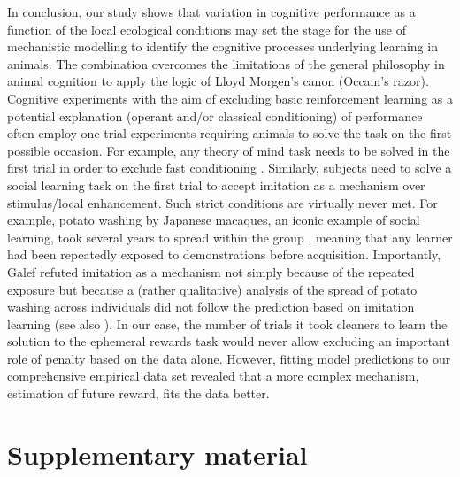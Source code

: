 \documentclass[]{rsos}%
\newcommand{\beginsupplement}{ \setcounter{table}{0}     \renewcommand{\thetable}{S\arabic{table}}\setcounter{figure}{0} \renewcommand{\thefigure}{S\arabic{figure}}}
\begin{document}
In conclusion, our study shows that variation in cognitive performance as
a function of the local ecological conditions may set the stage for the use of
mechanistic modelling to identify the cognitive processes underlying
learning in animals. The combination overcomes the limitations
of the general philosophy in animal cognition to apply the logic of
Lloyd Morgen's canon (Occam's razor). Cognitive experiments with the
aim of excluding basic reinforcement learning as a potential
explanation (operant and/or classical conditioning) of performance
often employ one trial experiments requiring animals to solve the
task on the first possible occasion.
For example, any theory of mind task needs to be solved in the first
trial in order to exclude fast conditioning \citep{heyes_Theory_1998}.
Similarly, subjects need to solve a social learning task on the first
trial to accept imitation as a mechanism over stimulus/local
enhancement. Such strict conditions are virtually never met. For
example, potato washing by Japanese macaques, an iconic example of
social learning, took several years to spread within the group
\citep{kawamura_Process_1959}, meaning that any learner had been repeatedly
exposed to demonstrations before acquisition. Importantly, Galef
\citep{galef_Question_1992} refuted imitation as a mechanism not simply because
of the repeated exposure but because a (rather qualitative) analysis of
the spread of potato washing across individuals did not follow the
prediction based on imitation learning (see also
\citep{hirata_SweetPotato_2001}). In our case, the number of trials it took
cleaners to learn the solution to the ephemeral rewards task
would never allow excluding an important role of
penalty based on the data
alone. However, fitting model predictions to our comprehensive empirical
data set revealed that a more complex mechanism, estimation of future reward,
fits the data better.

\newpage

\hypertarget{supplementary-material}{%
\section{Supplementary material}\label{supplementary-material}}

\beginsupplement
\end{document}
